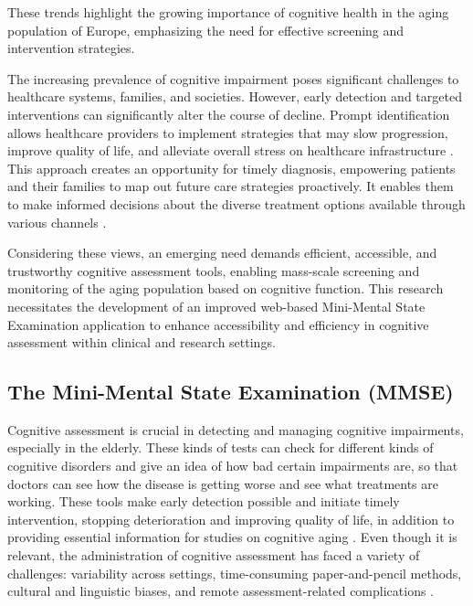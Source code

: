 These trends highlight the growing importance of cognitive health in the aging population of Europe, emphasizing the need for effective screening and intervention strategies.

The increasing prevalence of cognitive impairment poses significant challenges to healthcare systems, families, and societies. However, early detection and targeted interventions can significantly alter the course of decline. Prompt identification allows healthcare providers to implement strategies that may slow progression, improve quality of life, and alleviate overall stress on healthcare infrastructure \cite{Livingston2020}. This approach creates an opportunity for timely diagnosis, empowering patients and their families to map out future care strategies proactively. It enables them to make informed decisions about the diverse treatment options available through various channels \cite{Sperling2011}.

Considering these views, an emerging need demands efficient, accessible, and trustworthy cognitive assessment tools, enabling mass-scale screening and monitoring of the aging population based on cognitive function. This research necessitates the development of an improved web-based Mini-Mental State Examination application to enhance accessibility and efficiency in cognitive assessment within clinical and research settings.

\subsection{The Mini-Mental State Examination (MMSE)}

Cognitive assessment is crucial in detecting and managing cognitive impairments, especially in the elderly. These kinds of tests can check for different kinds of cognitive disorders and give an idea of how bad certain impairments are, so that doctors can see how the disease is getting worse and see what treatments are working. These tools make early detection possible and initiate timely intervention, stopping deterioration and improving quality of life, in addition to providing essential information for studies on cognitive aging \cite{Langa2015, Petersen2018, Weintraub2009}. Even though it is relevant, the administration of cognitive assessment has faced a variety of challenges: variability across settings, time-consuming paper-and-pencil methods, cultural and linguistic biases, and remote assessment-related complications \cite{Prince2013, Cordell2013, Henrich2010, Goldberg2015, Geddes2020, Bilder2020}.

